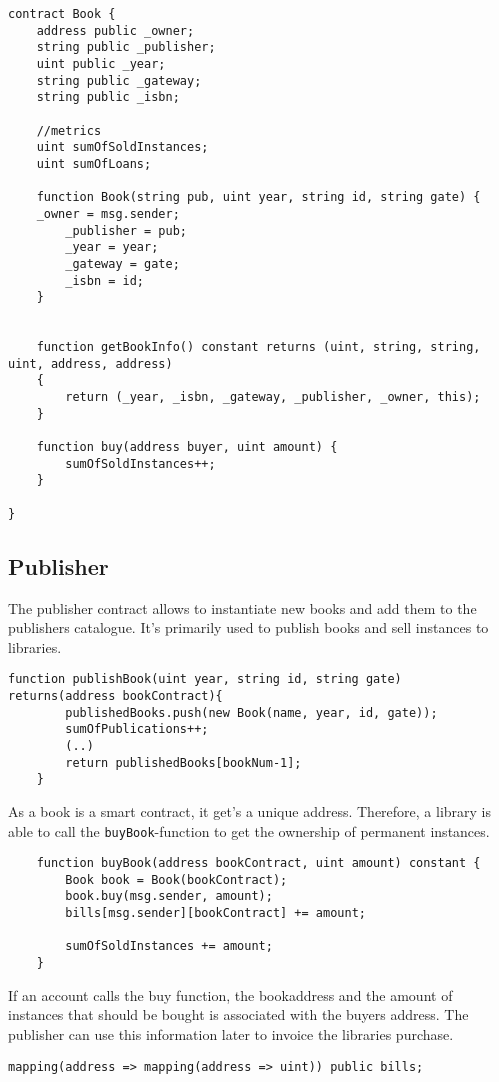 \begin{lstlisting}
contract Book {
	address public _owner;
	string public _publisher;
	uint public _year;
	string public _gateway;
	string public _isbn;

	//metrics
	uint sumOfSoldInstances;
	uint sumOfLoans;
  
	function Book(string pub, uint year, string id, string gate) {
  	_owner = msg.sender;
		_publisher = pub;
		_year = year;
		_gateway = gate;
		_isbn = id;
	}


	function getBookInfo() constant returns (uint, string, string, uint, address, address) 
	{
	 	return (_year, _isbn, _gateway, _publisher, _owner, this);
	}

	function buy(address buyer, uint amount) {
		sumOfSoldInstances++;
	}

}
\end{lstlisting}

\subsection{Publisher}
The publisher contract allows to instantiate new books and add them to the publishers catalogue. It's primarily used to publish books and sell instances to libraries.

\begin{lstlisting}
function publishBook(uint year, string id, string gate) returns(address bookContract){
		publishedBooks.push(new Book(name, year, id, gate));
		sumOfPublications++;
		(..)
		return publishedBooks[bookNum-1];
	}
\end{lstlisting}

As a book is a smart contract, it get's a unique address. Therefore, a library is able to call the \texttt{buyBook}-function to get the ownership of permanent instances.

\begin{lstlisting}
	function buyBook(address bookContract, uint amount) constant {
		Book book = Book(bookContract);
		book.buy(msg.sender, amount);	
		bills[msg.sender][bookContract] += amount;

		sumOfSoldInstances += amount;
	}
\end{lstlisting}

If an account calls the buy function, the bookaddress and the amount of instances that should be bought is associated with the buyers address. The publisher can use this information later to invoice the libraries purchase.

\begin{lstlisting}
mapping(address => mapping(address => uint)) public bills;
\end{lstlisting}

